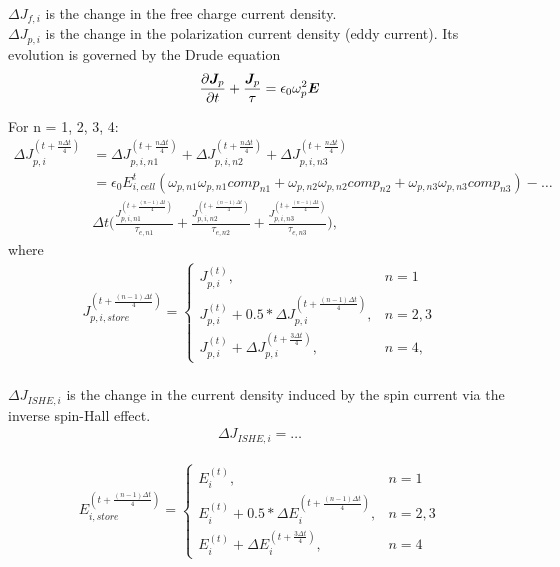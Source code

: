 \documentclass[]{article}
\begin{document}
		$\Delta J_{f, i}$ is the change in the free charge current density. \\

		$\Delta J_{p, i}$ is the change in the polarization current density (eddy current). Its evolution is governed by the Drude equation 
		\begin{equation}
			\pdv{\bm{J}_{p}}{t} + \frac{\bm{J}_{p}}{\tau} = \epsilon_{0}\omega_{p}^{2}\bm{E} 
		\end{equation}
		
		For n = 1, 2, 3, 4:
		\begin{align}
			\Delta J_{p, i}^{(t+\frac{n\Delta t}{4})} &= 
				\Delta J_{p, i, n1}^{(t+\frac{n\Delta t}{4})} + \Delta J_{p, i, n2}^{(t+\frac{n\Delta t}{4})} + \Delta J_{p, i, n3}^{(t+\frac{n\Delta t}{4})} \nonumber\\
				&= \epsilon_{0}E_{i, cell}^{t}(\omega_{p, n1}\omega_{p, n1}comp_{n1} + \omega_{p, n2}\omega_{p, n2}comp_{n2} + \omega_{p, n3}\omega_{p, n3}comp_{n3}) - \dots \nonumber\\
				& \Delta t\bigg(\frac{J_{p, i, n1}^{(t + \frac{(n-1)\Delta t}{4})}}{\tau_{e, n1}} + \frac{J_{p, i, n2}^{(t + \frac{(n-1)\Delta t}{4})}}{\tau_{e, n2}} + \frac{J_{p, i, n3}^{(t + \frac{(n-1)\Delta t}{4})}}{\tau_{e, n3}}\bigg),
		\end{align}
		where
		\begin{align}
			J_{p, i, store}^{(t + \frac{(n-1)\Delta t}{4})} = 
			\begin{cases}
				J_{p, i}^{(t)}, & n = 1\\
				J_{p, i}^{(t)} + 0.5*\Delta J_{p, i}^{(t+\frac{(n-1)\Delta t}{4})}, & n = 2, 3\\
				J_{p, i}^{(t)} + \Delta J_{p, i}^{(t+\frac{3\Delta t}{4})}, & n = 4,
			\end{cases} 
		\end{align} \\
		
		$\Delta J_{ISHE, i}$ is the change in the current density induced by the spin current via the inverse spin-Hall effect. 
		\begin{align}
			\Delta J_{ISHE, i} = \dots
		\end{align}
		
		
		\begin{align}
			E_{i, store}^{(t + \frac{(n-1)\Delta t}{4})} = 
			\begin{cases}
				E_{i}^{(t)}, & n = 1\\
				E_{i}^{(t)} + 0.5*\Delta E_{i}^{(t+\frac{(n-1)\Delta t}{4})}, & n = 2, 3\\
				E_{i}^{(t)} + \Delta E_{i}^{(t+\frac{3\Delta t}{4})}, & n = 4
			\end{cases} 
		\end{align}
		
\end{document}
